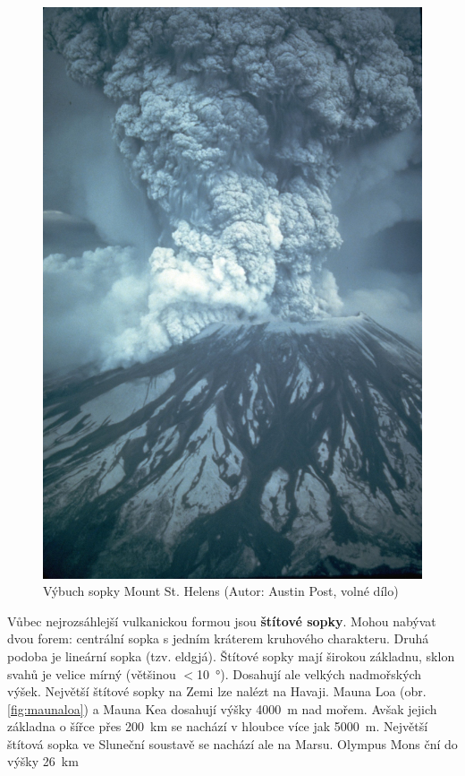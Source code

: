 \begin{figure}[h]
	\centering
	\includegraphics[width=\linewidth]{obrazky/sopky/st_helen}
	\caption{Výbuch sopky Mount St. Helens (Autor: Austin Post, volné dílo)}
	\label{fig:sthelen}
\end{figure}

Vůbec nejrozsáhlejší vulkanickou formou jsou \textbf{štítové sopky}. Mohou nabývat dvou forem: centrální sopka s jedním kráterem kruhového charakteru. Druhá podoba je lineární sopka (tzv. eldgjá). Štítové sopky mají širokou základnu, sklon svahů je velice mírný (většinou $<$\SI{10}{\degree}). Dosahují ale velkých nadmořských výšek. Největší štítové sopky na Zemi lze nalézt na Havaji. Mauna Loa (obr. \ref{fig:maunaloa}) a Mauna Kea dosahují výšky \SI{4000}{\metre} nad mořem. Avšak jejich základna o šířce přes \SI{200}{\kilo\metre} se nachází v hloubce více jak \SI{5000}{\metre}. Největší štítová sopka ve Sluneční soustavě se nachází ale na Marsu. Olympus Mons ční do výšky \SI{26}{\kilo\metre}

